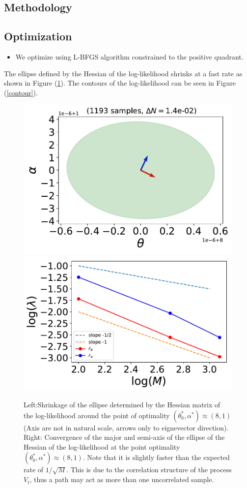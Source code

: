 \documentclass[ima, 20pt, portrait, plainboxedsections]{sciposter}
\begin{document}
\begin{multicols}{3}
\section*{Methodology}


\subsection*{ Optimization  }
\begin{itemize}
\item We optimize using L-BFGS algorithm constrained to the positive quadrant.
\end{itemize}
The ellipse defined by the  Hessian of the log-likelihood shrinks at a fast rate as shown in Figure (\ref{ellipse_drawing}). The contours of the  log-likelihood can be seen in Figure (\ref{contour}).

\begin{figure}[t]
\begin{center}
   \includegraphics[width=0.6\linewidth]{ellipse1193_samples_dN=14e-02.pdf}
    \includegraphics[width=0.6\linewidth]{ellipse_conv_samples_dN=14e-02.pdf}
\end{center}
   \caption{Left:Shrinkage of the ellipse determined by the Hessian matrix of the log-likelihood around the point of optimality $(\theta_0^*, \alpha^*)\approx (8,1)$ (Axis are not in natural scale, arrows only to  eignevector direction). Right: Convergence of the major and semi-axis of the ellipse  of the Hessian of the log-likelihood at the point optimality $(\theta_0^*, \alpha^*)\approx (8,1)$. Note that it is slightly faster than the expected rate of $1/\sqrt{M}$. This is due to the correlation structure of the process $V_t$, thus a path may act  as more than one  uncorrelated sample.}
\label{ellipse_drawing}
\end{figure}




\end{multicols}
\end{document}
